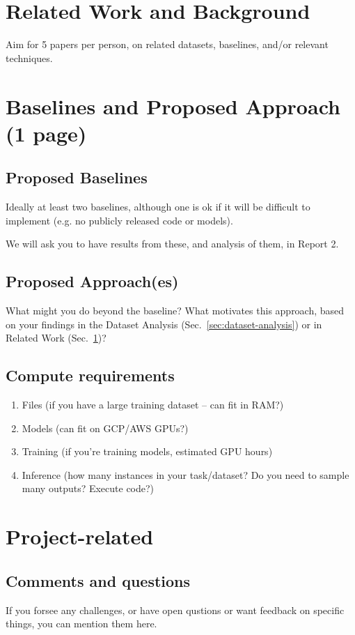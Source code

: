 \documentclass[11pt,a4paper]{article}
\begin{document}
\clearpage

\section{Related Work and Background}
\label{sec:related-work}
Aim for 5 papers per person, on related datasets, baselines, and/or relevant techniques.

\clearpage
\section{Baselines and Proposed Approach (1 page)}

\subsection{Proposed Baselines}
Ideally at least two baselines, although one is ok if it will be difficult to implement (e.g. no publicly released code or models).

We will ask you to have results from these, and analysis of them, in Report 2.

\subsection{Proposed Approach(es)}
What might you do beyond the baseline? What motivates this approach, based on your findings in the Dataset Analysis (Sec.\ \ref{sec:dataset-analysis})  or in Related Work (Sec.\ \ref{sec:related-work})?

\subsection{Compute requirements}
\begin{enumerate}
  \item Files (if you have a large training dataset -- can fit in RAM?)
  \item Models (can fit on GCP/AWS GPUs?)
  \item Training (if you're training models, estimated GPU hours)
  \item Inference (how many instances in your task/dataset? Do you need to sample many outputs? Execute code?)
\end{enumerate}

\clearpage
\section{Project-related}
\subsection{Comments and questions}
If you forsee any challenges, or have open qustions or want feedback on specific things, you can mention them here.
\end{document}
